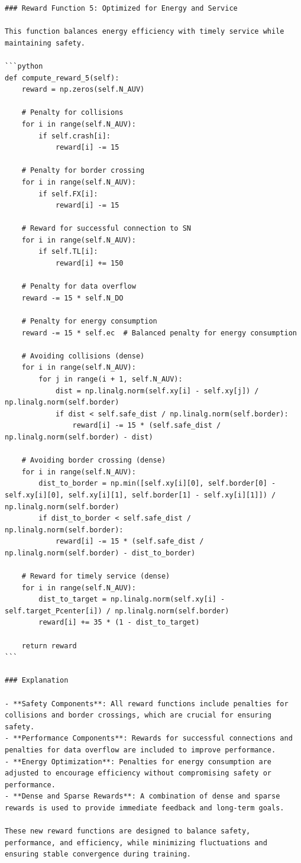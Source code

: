 \documentclass{article}
\begin{document}
\begin{verbatim}
### Reward Function 5: Optimized for Energy and Service

This function balances energy efficiency with timely service while maintaining safety.

```python
def compute_reward_5(self):
    reward = np.zeros(self.N_AUV)
    
    # Penalty for collisions
    for i in range(self.N_AUV):
        if self.crash[i]:
            reward[i] -= 15

    # Penalty for border crossing
    for i in range(self.N_AUV):
        if self.FX[i]:
            reward[i] -= 15

    # Reward for successful connection to SN
    for i in range(self.N_AUV):
        if self.TL[i]:
            reward[i] += 150

    # Penalty for data overflow
    reward -= 15 * self.N_DO

    # Penalty for energy consumption
    reward -= 15 * self.ec  # Balanced penalty for energy consumption

    # Avoiding collisions (dense)
    for i in range(self.N_AUV):
        for j in range(i + 1, self.N_AUV):
            dist = np.linalg.norm(self.xy[i] - self.xy[j]) / np.linalg.norm(self.border)
            if dist < self.safe_dist / np.linalg.norm(self.border):
                reward[i] -= 15 * (self.safe_dist / np.linalg.norm(self.border) - dist)

    # Avoiding border crossing (dense)
    for i in range(self.N_AUV):
        dist_to_border = np.min([self.xy[i][0], self.border[0] - self.xy[i][0], self.xy[i][1], self.border[1] - self.xy[i][1]]) / np.linalg.norm(self.border)
        if dist_to_border < self.safe_dist / np.linalg.norm(self.border):
            reward[i] -= 15 * (self.safe_dist / np.linalg.norm(self.border) - dist_to_border)

    # Reward for timely service (dense)
    for i in range(self.N_AUV):
        dist_to_target = np.linalg.norm(self.xy[i] - self.target_Pcenter[i]) / np.linalg.norm(self.border)
        reward[i] += 35 * (1 - dist_to_target)

    return reward
```

### Explanation

- **Safety Components**: All reward functions include penalties for collisions and border crossings, which are crucial for ensuring safety.
- **Performance Components**: Rewards for successful connections and penalties for data overflow are included to improve performance.
- **Energy Optimization**: Penalties for energy consumption are adjusted to encourage efficiency without compromising safety or performance.
- **Dense and Sparse Rewards**: A combination of dense and sparse rewards is used to provide immediate feedback and long-term goals.

These new reward functions are designed to balance safety, performance, and efficiency, while minimizing fluctuations and ensuring stable convergence during training.

\end{verbatim}
\end{document}
